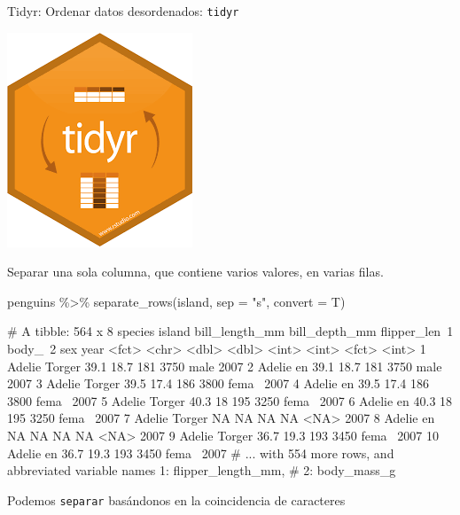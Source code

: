 \documentclass[
  ignorenonframetext,
  aspectratio=169]{beamer}
\newenvironment{Shaded}{\begin{snugshade}}{\end{snugshade}}
\newcommand{\AttributeTok}[1]{\textcolor[rgb]{0.77,0.63,0.00}{#1}}
\newcommand{\FunctionTok}[1]{\textcolor[rgb]{0.00,0.00,0.00}{#1}}
\newcommand{\NormalTok}[1]{#1}
\newcommand{\SpecialCharTok}[1]{\textcolor[rgb]{0.00,0.00,0.00}{#1}}
\newcommand{\StringTok}[1]{\textcolor[rgb]{0.31,0.60,0.02}{#1}}
\let\oldverbatim\verbatim
\let\endoldverbatim\endverbatim
\renewenvironment{verbatim}{\tiny\oldverbatim}{\endoldverbatim}
\begin{document}
\begin{frame}[fragile]{Tidyr: Ordenar datos desordenados:
\texttt{tidyr}}
\protect\hypertarget{tidyr-ordenar-datos-desordenados-tidyr-9}{}
\begin{flushright}\includegraphics[width=0.03\linewidth]{Imgs/logo_tidyr} \end{flushright}

Separar una sola columna, que contiene varios valores, en varias filas.

\begin{Shaded}
\begin{Highlighting}[]
\NormalTok{penguins }\SpecialCharTok{\%\textgreater{}\%} \FunctionTok{separate\_rows}\NormalTok{(island, }\AttributeTok{sep =} \StringTok{"s"}\NormalTok{, }\AttributeTok{convert =}\NormalTok{ T)}
\end{Highlighting}
\end{Shaded}

\begin{verbatim}
# A tibble: 564 x 8
   species island bill_length_mm bill_depth_mm flipper_len~1 body_~2 sex    year
   <fct>   <chr>           <dbl>         <dbl>         <int>   <int> <fct> <int>
 1 Adelie  Torger           39.1          18.7           181    3750 male   2007
 2 Adelie  en               39.1          18.7           181    3750 male   2007
 3 Adelie  Torger           39.5          17.4           186    3800 fema~  2007
 4 Adelie  en               39.5          17.4           186    3800 fema~  2007
 5 Adelie  Torger           40.3          18             195    3250 fema~  2007
 6 Adelie  en               40.3          18             195    3250 fema~  2007
 7 Adelie  Torger           NA            NA              NA      NA <NA>   2007
 8 Adelie  en               NA            NA              NA      NA <NA>   2007
 9 Adelie  Torger           36.7          19.3           193    3450 fema~  2007
10 Adelie  en               36.7          19.3           193    3450 fema~  2007
# ... with 554 more rows, and abbreviated variable names 1: flipper_length_mm,
#   2: body_mass_g
\end{verbatim}

Podemos \texttt{separar} basándonos en la coincidencia de caracteres
\end{frame}
\end{document}
